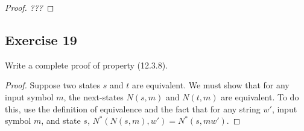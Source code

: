 \documentclass[14pt]{extarticle}
\begin{document}
\begin{proof}
{\it ???}
\end{proof}

\subsection{Exercise 19}
Write a complete proof of property (12.3.8).

\begin{proof}
Suppose two states \(s\) and \(t\) are equivalent. We must show that for any input symbol \(m\), the next-states 
\(N(s, m)\) and \(N(t, m)\) are equivalent. To do this, use the definition of equivalence and the fact that for any string 
\(w'\), input symbol \(m\), and state \(s\), \(N^*(N(s, m), w') = N^*(s, mw')\).
\end{proof}
\end{document}
